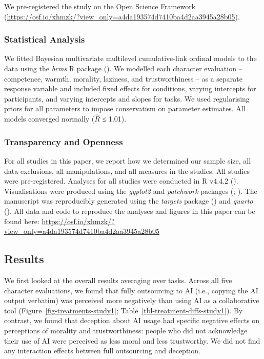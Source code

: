 \documentclass[
  man,
  floatsintext,
  longtable,
  nolmodern,
  notxfonts,
  notimes,
  colorlinks=true,linkcolor=blue,citecolor=blue,urlcolor=blue]{apa7}
\begin{document}
We pre-registered the study on the Open Science Framework
(\url{https://osf.io/xhmzk/?view_only=a4da193574d7410ba4d2aa3945a28b05}).

\subsubsection*{Statistical Analysis}\label{statistical-analysis}

We fitted Bayesian multivariate multilevel cumulative-link ordinal
models to the data using the \emph{brms} R package
(). We modelled each character
evaluation -- competence, warmth, morality, laziness, and
trustworthiness -- as a separate response variable and included fixed
effects for conditions, varying intercepts for participants, and varying
intercepts and slopes for tasks. We used regularising priors for all
parameters to impose conservatism on parameter estimates. All models
converged normally (\(\hat{R}\) ≤ 1.01).

\subsubsection*{Transparency and
Openness}\label{transparency-and-openness}

For all studies in this paper, we report how we determined our sample
size, all data exclusions, all manipulations, and all measures in the
studies. All studies were pre-registered. Analyses for all studies were
conducted in R v4.4.2 ().
Visualisations were produced using the \emph{ggplot2} and
\emph{patchwork} packages (;
). The manuscript was
reproducibly generated using the \emph{targets} package
() and \emph{quarto}
(). All data and code to
reproduce the analyses and figures in this paper can be found here:
\url{https://osf.io/xhmzk/?view_only=a4da193574d7410ba4d2aa3945a28b05}

\subsection*{Results}\label{results}

We first looked at the overall results averaging over tasks. Across all
five character evaluations, we found that fully outsourcing to AI (i.e.,
copying the AI output verbatim) was perceived more negatively than using
AI as a collaborative tool (Figure~\ref{fig-treatments-study1};
Table~\ref{tbl-treatment-diffs-study1}). By contrast, we found that
deception about AI usage had specific negative effects on perceptions of
morality and trustworthiness: people who did not acknowledge their use
of AI were perceived as less moral and less trustworthy. We did not find
any interaction effects between full outsourcing and deception.
\end{document}
